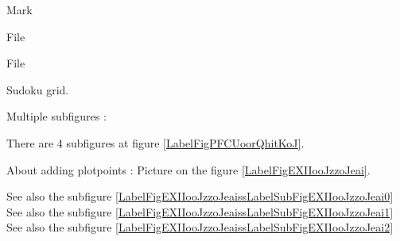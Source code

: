 \begin{center}

\end{center}


\begin{center}

\end{center}



Mark

\begin{center}

\end{center}


\begin{center}

\end{center}


File 
\begin{center}

\end{center}


File 
\begin{center}
   
\end{center}
   

Sudoku grid.

\begin{center}
   
\end{center}
   

   \clearpage

Multiple subfigures :

There are 4 subfigures at figure \ref{LabelFigPFCUoorQhitKoJ}. %
\newcommand{\CaptionFigPFCUoorQhitKoJ}{4 subfigures still to be descripted.}



\clearpage

About adding plotpoints : Picture  on the figure \ref{LabelFigEXIIooJzzoJeai}. %
\newcommand{\CaptionFigEXIIooJzzoJeai}{<+Type your caption here+>}

See also the subfigure \ref{LabelFigEXIIooJzzoJeaissLabelSubFigEXIIooJzzoJeai0}
See also the subfigure \ref{LabelFigEXIIooJzzoJeaissLabelSubFigEXIIooJzzoJeai1}
See also the subfigure \ref{LabelFigEXIIooJzzoJeaissLabelSubFigEXIIooJzzoJeai2}



